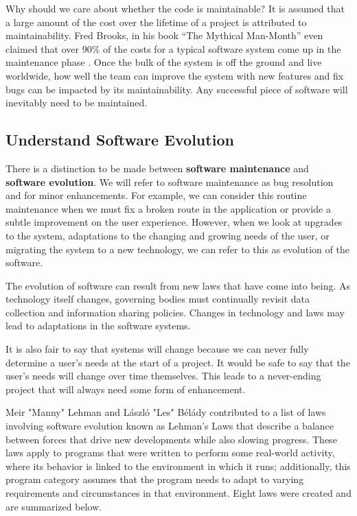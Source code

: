 \documentclass[12pt,conference]{IEEEtran}
\begin{document}
Why should we care about whether the code is maintainable? It is assumed that a large amount of the cost over the lifetime of a project is attributed to maintainability. Fred Brooks, in his book ``The Mythical Man-Month'' even claimed that over 90\% of the costs for a typical software system come up in the maintenance phase \cite{brooks:mythical}. Once the bulk of the system is off the ground and live worldwide, how well the team can improve the system with new features and fix bugs can be impacted by its maintainability. Any successful piece of software will inevitably need to be maintained.

\subsection{Understand Software Evolution}

There is a distinction to be made between \textbf{software maintenance} and \textbf{software evolution}. We will refer to software maintenance as bug resolution and for minor enhancements. For example, we can consider this routine maintenance when we must fix a broken route in the application or provide a subtle improvement on the user experience. However, when we look at upgrades to the system, adaptations to the changing and growing needs of the user, or migrating the system to a new technology, we can refer to this as evolution of the software.

The evolution of software can result from new laws that have come into being. As technology itself changes, governing bodies must continually revisit data collection and information sharing policies. Changes in technology and laws may lead to adaptations in the software systems.

It is also fair to say that systems will change because we can never fully determine a user's needs at the start of a project. It would be safe to say that the user's needs will change over time themselves. This leads to a never-ending project that will always need some form of enhancement.

Meir "Manny" Lehman and László "Les" Bélády contributed to a list of laws involving software evolution known as Lehman's Laws that describe a balance between forces that drive new developments while also slowing progress. These laws apply to programs that were written to perform some real-world activity, where its behavior is linked to the environment in which it runs; additionally, this program category assumes that the program needs to adapt to varying requirements and circumstances in that environment. Eight laws were created and are summarized below.
\cite{wiki:lehmans-laws}
\end{document}
